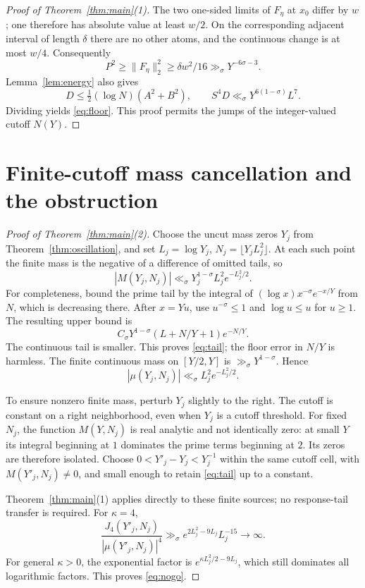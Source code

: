 \documentclass[11pt,a4paper]{article}
\theoremstyle{definition}
\theoremstyle{remark}
\begin{document}
\begin{proof}[Proof of Theorem~\ref{thm:main}(1)]
The two one-sided limits of \(F_\eta\) at \(x_0\) differ by \(w\);
one therefore has absolute value at least \(w/2\).
On the corresponding adjacent interval of length \(\delta\) there
are no other atoms, and the continuous change is at most \(w/4\).
Consequently
\[
 P^2\ge\|F_\eta\|_2^2\ge\delta w^2/16
 \gg_\sigma Y^{-6\sigma-3}.
\]
Lemma~\ref{lem:energy} also gives
\[
 D\le\tfrac12(\log N)(A^2+B^2),\qquad
 S^4D\ll_\sigma Y^{6(1-\sigma)}L^7.
\]
Dividing yields \eqref{eq:floor}. This proof permits the jumps of
the integer-valued cutoff \(N(Y)\).
\end{proof}

\section{Finite-cutoff mass cancellation and the obstruction}

\begin{proof}[Proof of Theorem~\ref{thm:main}(2)]
Choose the uncut mass zeros \(Y_j\) from
Theorem~\ref{thm:oscillation}, and set \(L_j=\log Y_j\),
\(N_j=\lfloor Y_jL_j^2\rfloor\).
At each such point the finite mass is the negative of a difference
of omitted tails, so
\begin{equation}
 |M(Y_j,N_j)|\ll_\sigma
 Y_j^{1-\sigma}L_j^2e^{-L_j^2/2}.
 \label{eq:tail}
\end{equation}
For completeness, bound the prime tail by the integral of
\((\log x)x^{-\sigma}e^{-x/Y}\) from \(N\), which is decreasing
there. After \(x=Yu\), use \(u^{-\sigma}\le1\) and \(\log u\le u\)
for \(u\ge1\). The resulting upper bound is
\[
 C_\sigma Y^{1-\sigma}(L+N/Y+1)e^{-N/Y}.
\]
The continuous tail is smaller. This proves \eqref{eq:tail};
the floor error in \(N/Y\) is harmless.
The finite continuous mass on \([Y/2,Y]\) is
\(\gg_\sigma Y^{1-\sigma}\). Hence
\[
 |\mu(Y_j,N_j)|\ll_\sigma L_j^2e^{-L_j^2/2}.
\]

To ensure nonzero finite mass, perturb \(Y_j\) slightly to the right.
The cutoff is constant on a right neighborhood, even when \(Y_j\)
is a cutoff threshold. For fixed \(N_j\), the function
\(M(Y,N_j)\) is real analytic and not identically zero: at small
\(Y\) its integral beginning at \(1\) dominates the prime terms
beginning at \(2\). Its zeros are therefore isolated.
Choose \(0<Y'_j-Y_j<Y_j^{-1}\) within the same cutoff cell, with
\(M(Y'_j,N_j)\ne0\), and small enough to retain
\eqref{eq:tail} up to a constant.

Theorem~\ref{thm:main}(1) applies directly to these finite sources;
no response-tail transfer is required. For \(\kappa=4\),
\[
 \frac{J_4(Y'_j,N_j)}{|\mu(Y'_j,N_j)|^4}
 \gg_\sigma e^{2L_j^2-9L_j}L_j^{-15}\longrightarrow\infty.
\]
For general \(\kappa>0\), the exponential factor is
\(e^{\kappa L_j^2/2-9L_j}\), which still dominates all logarithmic
factors. This proves \eqref{eq:nogo}.
\end{proof}
\end{document}
